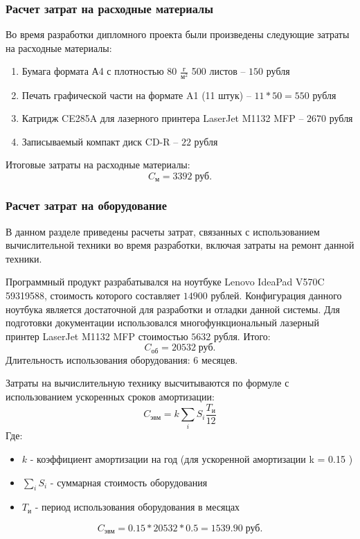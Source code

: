 \documentclass[russian,utf8,emptystyle]{eskdtext}
\begin{document}
\begin{spacing}{1.5}
\subsubsection{Расчет затрат на расходные материалы}
Во время разработки дипломного проекта были произведены следующие затраты на расходные материалы:
\begin{enumerate}
\item Бумага формата А4 с плотностью 80 $\frac{\text{г}}{\text{м}^2}$ 500 листов -- $150$ рубля
\item Печать графической части на формате A1 (11 штук) -- $11 * 50 = 550$ рубля
\item Катридж CE285A для лазерного принтера LaserJet M1132 MFP -- $2670$ рубля
\item Записываемый компакт диск CD-R -- $22$ рубля
\end{enumerate}
Итоговые затраты на расходные материалы: 
$$
C_\text{м} = 3392 \; \text{руб.}
$$

\subsubsection{Расчет затрат на оборудование}
В данном разделе приведены расчеты затрат, связанных с использованием вычислительной техники во время разработки, включая затраты на ремонт данной техники.

Программный продукт разрабатывался на ноутбуке Lenovo IdeaPad V570C 59319588, стоимость которого составляет $14900$ рублей. Конфигурация данного ноутбука является достаточной для разработки и отладки данной системы. Для подготовки документации использовался многофункциональный лазерный принтер LaserJet M1132 MFP стоимостью $5632$ рубля. Итого:
$$
C_\text{об} = 20532 \; \text{руб.}
$$
Длительность использования оборудования: 6 месяцев.

Затраты на вычислительную технику высчитываются по формуле с использованием ускоренных сроков амортизации:
$$
C_\text{эвм} = k \sum_i S_i \frac{T_\text{и}}{12}
$$
Где:
\begin{itemize}
\item $k$ - коэффициент амортизации на год (для ускоренной амортизации k = 0.15 )
\item $\sum_i S_i$ - суммарная стоимость оборудования
\item $T_\text{и}$ - период использования оборудования в месяцах
\end{itemize}

$$
C_\text{эвм} = 0.15 * 20532 * 0.5 = 1539.90 \; \text{руб.}
$$


\end{spacing}
\end{document}
